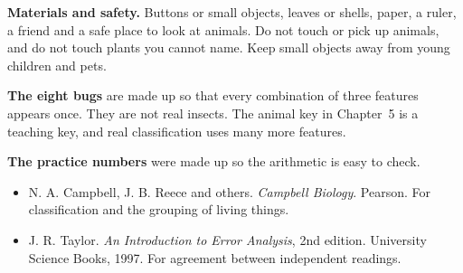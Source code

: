 \textbf{Materials and safety.} Buttons or small objects, leaves or shells, paper, a ruler, a friend and a safe place to look at animals. Do not touch or pick up animals, and do not touch plants you cannot name. Keep small objects away from young children and pets.

\textbf{The eight bugs} are made up so that every combination of three features appears once. They are not real insects. The animal key in Chapter~5 is a teaching key, and real classification uses many more features.

\textbf{The practice numbers} were made up so the arithmetic is easy to check.

\begin{itemize}[leftmargin=1.3em,itemsep=0.2em]
\item N. A. Campbell, J. B. Reece and others. \emph{Campbell Biology}. Pearson. For classification and the grouping of living things.
\item J. R. Taylor. \emph{An Introduction to Error Analysis}, 2nd edition. University Science Books, 1997. For agreement between independent readings.
\end{itemize}

\clearpage
\thispagestyle{blank}
